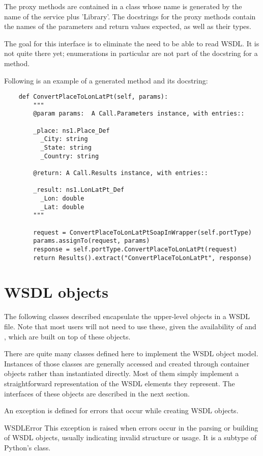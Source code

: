 The proxy methods are contained in a class whose name
is generated by the name of the service plus 'Library'.
The docstrings for the proxy methods contain the names of
the parameters and return values expected, as well as their types.

The goal for this interface is to eliminate the need to be able
to read WSDL.  It is not quite there yet; enumerations in
particular are not part of the docstring for a method.

Following is an example of a generated method and its docstring:

\begin{verbatim}
    def ConvertPlaceToLonLatPt(self, params):
        """
        @param params:  A Call.Parameters instance, with entries::

        _place: ns1.Place_Def
          _City: string
          _State: string
          _Country: string

        @return: A Call.Results instance, with entries::

        _result: ns1.LonLatPt_Def
          _Lon: double
          _Lat: double
        """

        request = ConvertPlaceToLonLatPtSoapInWrapper(self.portType)
        params.assignTo(request, params)
        response = self.portType.ConvertPlaceToLonLatPt(request)
        return Results().extract("ConvertPlaceToLonLatPt", response)
\end{verbatim}

\section{WSDL objects}

The following classes described encapsulate the upper-level objects
in a WSDL file.  Note that most users will not need to use these,
given the availability of  and
, which are built on top of these objects.

There are quite many classes defined here to
implement the WSDL object model. Instances of those classes are generally 
accessed and created through container objects rather than instantiated 
directly. Most of them simply implement a straightforward representation of 
the WSDL elements they represent. The interfaces of these objects are 
described in the next section.

An exception is defined for errors that occur while creating WSDL objects.

\begin{excdesc}{WSDLError}
This exception is raised when errors occur in the parsing or building of 
WSDL objects, usually indicating invalid structure or usage.
It is a subtype of Python's  class.
\end{excdesc}

